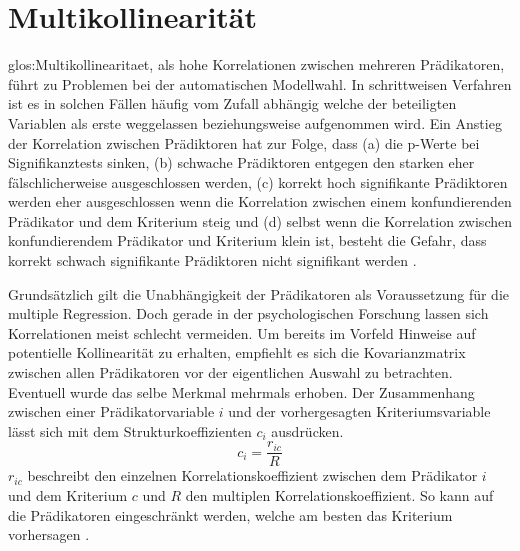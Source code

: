 \section{Multikollinearität}
\Gls{glos:Multikollinearitaet}, als hohe Korrelationen zwischen mehreren Prädikatoren, führt zu Problemen bei der automatischen Modellwahl. 
In schrittweisen Verfahren ist es in solchen Fällen häufig vom Zufall abhängig welche der beteiligten Variablen als erste weggelassen beziehungsweise aufgenommen wird. 
Ein Anstieg der Korrelation zwischen Prädiktoren hat zur Folge, dass (a) die p-Werte bei Signifikanztests sinken, (b) schwache Prädiktoren entgegen den starken eher fälschlicherweise ausgeschlossen werden, (c) korrekt hoch signifikante Prädiktoren werden eher ausgeschlossen wenn die Korrelation zwischen einem konfundierenden Prädikator und dem Kriterium steig und (d) selbst wenn die Korrelation zwischen konfundierendem Prädikator und Kriterium klein ist, besteht die Gefahr, dass korrekt schwach signifikante Prädiktoren nicht signifikant werden \cite[p. 2810]{graham2003confronting}.

Grundsätzlich gilt die Unabhängigkeit der Prädikatoren als Voraussetzung für die multiple Regression. Doch gerade in der psychologischen Forschung lassen sich Korrelationen meist schlecht vermeiden.
Um bereits im Vorfeld Hinweise auf potentielle Kollinearität zu erhalten, empfiehlt es sich die Kovarianzmatrix zwischen allen Prädikatoren vor der eigentlichen Auswahl zu betrachten.
Eventuell wurde das selbe Merkmal mehrmals erhoben.
Der Zusammenhang zwischen einer Prädikatorvariable $i$ und der vorhergesagten Kriteriumsvariable lässt sich mit dem Strukturkoeffizienten $c_i$ ausdrücken.
\begin{equation}
c_i = \frac{r_{ic}}{R}
\tag{Strukturkoeffizient}
\end{equation}
$r_{ic}$ beschreibt den einzelnen Korrelationskoeffizient zwischen dem Prädikator $i$ und dem Kriterium $c$ und $R$ den multiplen Korrelationskoeffizient. 
So kann auf die Prädikatoren eingeschränkt werden,  welche am besten das Kriterium vorhersagen \cite[S. 453]{bortz2011}. 
